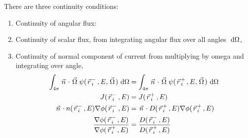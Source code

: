 \documentclass{school-22.211-notes}
\begin{document}
There are three continuity conditions:
\begin{enumerate}
\item Continuity of angular flux: 
\item Continuity of scalar flux, from integrating angular flux over all angles $\mbox{ }\mathrm{d} \Omega$, 
\item Continuity of normal component of current from multiplying by omega and integrating over angle, 
  \begin{align}
    \int_{4\pi} \left.\vec{n}\right. \cdot \left.\vec{\Omega}\right. \psi(\left.\vec{r}\right._i^-, E, \left.\vec{\Omega}\right.) \mbox{ }\mathrm{d} \Omega &= \int_{4\pi} \left.\vec{n}\right. \cdot \left.\vec{\Omega}\right. \psi(\left.\vec{r}\right._i^+, E, \left.\vec{\Omega}\right.) \mbox{ }\mathrm{d} \Omega \\
    J(\left.\vec{r}\right._i^-, E) &= J(\left.\vec{r}\right._i^+, E) \\
    \left.\vec{n}\right. \cdot n(\left.\vec{r}\right._i^-, E) \nabla \phi(\left.\vec{r}\right._i^-, E) &= \left.\vec{n}\right. \cdot D(\left.\vec{r}\right._i^+, E) \nabla \phi(\left.\vec{r}\right._i^+, E) \\
    \frac{\nabla \phi(\left.\vec{r}\right._i^-, E)}{\nabla \phi(\left.\vec{r}\right._i^+, E)} &= \frac{D(\left.\vec{r}\right._i^-, E)}{D(\left.\vec{r}\right._i^+, E)} 
  \end{align}
\end{enumerate}
\end{document}
